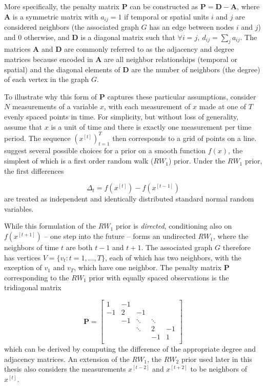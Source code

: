 More specifically, the penalty matrix $\mathbf{P}$ can be constructed as  $\mathbf{P} = \mathbf{D} - \mathbf{A}$, where $\mathbf{A}$ is a symmetric matrix with $a_{ij} = 1$ if temporal or spatial units $i$ and $j$ are considered neighbors (the associated graph $G$ has an edge between nodes $i$ and $j$) and 0 otherwise, and $\mathbf{D}$ is a diagonal matrix such that $\forall i = j, \: d_{ij} = \sum_j a_{ij}$. The matrices $\mathbf{A}$ and $\mathbf{D}$ are commonly referred to as the adjacency and degree matrices because encoded in $\mathbf{A}$ are all neighbor relationships (temporal or spatial) and the diagonal elements of $\mathbf{D}$ are the number of neighbors (the degree) of each vertex in the graph $G$.

To illustrate why this form of $\mathbf{P}$ captures these particular assumptions, consider $N$ measurements of a variable $x$, with each measurement of $x$ made at one of $T$ evenly spaced points in time. For simplicity, but without loss of generality,  assume that $x$ is a unit of time and there is exactly one measurement per time period.  The sequence $(x^{[t]})_{t=1}^T$ then corresponds to a grid of points on a line.   suggest several possible choices for a prior on a smooth function $f(x)$, the simplest of which is a first order random walk ($RW_1$) prior.  Under the $RW_1$ prior, the first differences

{\singlespacing
$$\Delta_t = f(x^{[t]}) - f(x^{[t-1]})$$
}
%
\noindent are treated as independent and identically distributed standard normal random variables. 

While this formulation of the $RW_1$ prior is {\it directed}, conditioning also on $f(x^{[t+1]})$ -- one step into the future -- forms an undirected $RW_1$, where the neighbors of time $t$ are both $t-1$ and $t+1$.  The associated graph $G$ therefore has vertices $V=\{v_t : t=1,\dots,T\}$, each of which has two neighbors, with the exception of $v_1$ and $v_T$, which have one neighbor. The penalty matrix $\mathbf{P}$ corresponding to the $RW_1$ prior with equally spaced observations is the tridiagonal matrix

{\singlespacing
$$ \mathbf{P} = 
\begin{bmatrix}
1  	& -1 	& 		& 	& \\
-1  	& 2 	& -1 		& 	& \\
  	& -1 	& \ddots 	& \ddots	& \\
  	&  	& \ddots 	& 2 	& -1\\
  	&  	& 		& -1 	& 1\\
\end{bmatrix}
$$
}
%
\noindent which can be derived by computing the difference of the appropriate degree and adjacency matrices. An extension of the $RW_1$, the $RW_2$ prior used later in this thesis also considers the measurements $x^{[t-2]}$  and $x^{[t+2]}$ to be neighbors of $x^{[t]}$. 

